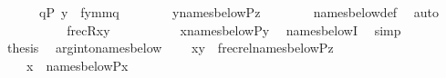 \begin{isabellebody}
\ \ \ \ \ \ {\isachardoublequoteopen}q{\isasymin}P{\isachardoublequoteclose}\ {\isachardoublequoteopen}y\ {\isacharequal}{\kern0pt}\ {\isasymlangle}fy{\isacharcomma}{\kern0pt}m{}{\isacharcomma}{\kern0pt}m{}{\isacharcomma}{\kern0pt}q{\isasymrangle}{\isachardoublequoteclose}\isanewline
\ \ \ \ \ \ \isamarkupfalse%
\ {\isacartoucheopen}y{\isasymin}names{\isacharunderscore}{\kern0pt}below{\isacharparenleft}{\kern0pt}P{\isacharcomma}{\kern0pt}z{\isacharparenright}{\kern0pt}{\isacartoucheclose}\isanewline
\ \ \ \ \ \ \isamarkupfalse%
\ names{\isacharunderscore}{\kern0pt}below{\isacharunderscore}{\kern0pt}def\ \isamarkupfalse%
\ auto\isanewline
\ \ \ \ \isamarkupfalse%
\isanewline
\ \ \ \ \isamarkupfalse%
\ {\isacartoucheopen}frecR{\isacharparenleft}{\kern0pt}x{\isacharcomma}{\kern0pt}y{\isacharparenright}{\kern0pt}{\isacartoucheclose}\isanewline
\ \ \ \ \isamarkupfalse%
\isanewline
\ \ \ \ \isamarkupfalse%
\ {\isachardoublequoteopen}x{\isasymin}names{\isacharunderscore}{\kern0pt}below{\isacharparenleft}{\kern0pt}P{\isacharcomma}{\kern0pt}y{\isacharparenright}{\kern0pt}{\isachardoublequoteclose}\ \isamarkupfalse%
\ names{\isacharunderscore}{\kern0pt}belowI\ \isamarkupfalse%
\ simp\isanewline
\ \ \isacommand{{\isacharbraceright}{\kern0pt}}\isamarkupfalse%
\isanewline
\ \ \isamarkupfalse%
\ \isamarkupfalse%
\ {\isacharquery}{\kern0pt}thesis\ \isacommand{{\isachardot}{\kern0pt}}\isamarkupfalse%
\isanewline
{}\isamarkupfalse%
%
\endisatagproof
{\isafoldproof}%
%
\isadelimproof
\isanewline
%
\endisadelimproof
\isanewline
{}\isamarkupfalse%
\ arg{\isacharunderscore}{\kern0pt}into{\isacharunderscore}{\kern0pt}names{\isacharunderscore}{\kern0pt}below\ {\isacharcolon}{\kern0pt}\isanewline
\ \ \ {\isachardoublequoteopen}{\isasymlangle}x{\isacharcomma}{\kern0pt}y{\isasymrangle}\ {\isasymin}\ frecrel{\isacharparenleft}{\kern0pt}names{\isacharunderscore}{\kern0pt}below{\isacharparenleft}{\kern0pt}P{\isacharcomma}{\kern0pt}z{\isacharparenright}{\kern0pt}{\isacharparenright}{\kern0pt}{\isachardoublequoteclose}\isanewline
\ \ \ \ {\isachardoublequoteopen}x\ {\isasymin}\ names{\isacharunderscore}{\kern0pt}below{\isacharparenleft}{\kern0pt}P{\isacharcomma}{\kern0pt}x{\isacharparenright}{\kern0pt}{\isachardoublequoteclose}\isanewline
%
\isadelimproof
%
\endisadelimproof
%
\isatagproof
{}\isamarkupfalse%

\end{isabellebody}
